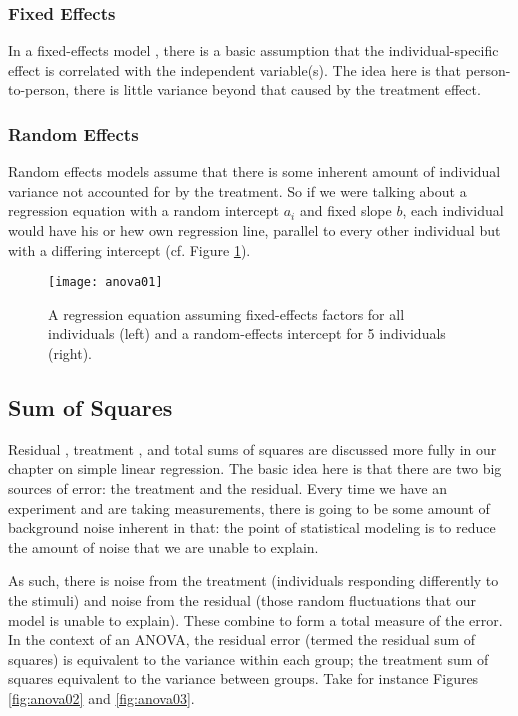 \subsubsection{Fixed Effects}

In a fixed-effects model , there is a basic assumption that the individual-specific effect is correlated with the independent variable(s). The idea here is that person-to-person, there is little variance beyond that caused by the treatment effect.

\subsubsection{Random Effects}

Random effects  models assume that there is some inherent amount of individual variance not accounted for by the treatment. So if we were talking about a regression equation with a random intercept $a_i$ and fixed slope $b$, each individual would have his or hew own regression line, parallel to every other individual but with a differing intercept (cf. Figure \ref{fig:anova01}).

\begin{figure}[htp]
\texttt{[image: anova01]}
\caption{A regression equation assuming fixed-effects factors for all individuals (left) and a random-effects intercept for 5 individuals (right).}
\label{fig:anova01}
\end{figure}

\subsection{Sum of Squares}

Residual , treatment , and total sums of squares  are discussed more fully in our chapter on simple linear regression. The basic idea here is that there are two big sources of error: the treatment and the residual. Every time we have an experiment and are taking measurements, there is going to be some amount of background noise inherent in that: the point of statistical modeling is to reduce the amount of noise that we are unable to explain.

As such, there is noise from the treatment (individuals responding differently to the stimuli) and noise from the residual (those random fluctuations that our model is unable to explain). These combine to form a total measure of the error. In the context of an ANOVA, the residual error (termed the residual sum of squares) is equivalent to the variance within each group; the treatment sum of squares equivalent to the variance between groups. Take for instance Figures \ref{fig:anova02} and \ref{fig:anova03}.

